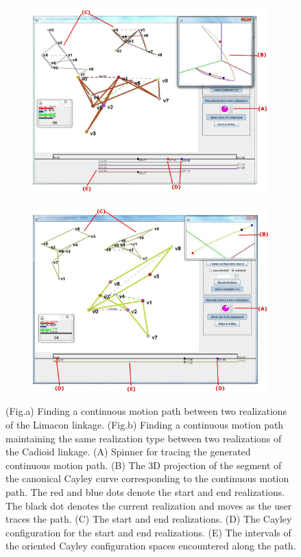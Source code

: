 \documentclass[10pt]{article}
\begin{document}
\begin{figure}[hbtp] 
\centering
\begin{subfigure}[b]{\linewidth}
\centering
\includegraphics[width=.65\textwidth]{img/path}
\caption{}
\end{subfigure}
%
\begin{subfigure}[b]{\linewidth}
\centering
\includegraphics[width=.65\textwidth]{img/opath}
\caption{}
\end{subfigure}

\caption{(Fig.a) Finding a continuous motion path between two realizations of the Limacon linkage. 
(Fig.b) Finding a continuous motion path maintaining the same realization type between two realizations of the Cadioid linkage. 
(A) Spinner for tracing the generated continuous motion path. 
(B) The 3D projection of the segment of the canonical Cayley curve corresponding to the continuous motion path. 
The red and blue dots denote the start and end realizations. 
The black dot denotes the current realization and moves as the user traces the path. 
(C) The start and end realizations.
(D) The Cayley configuration for the start and end realizations.
(E) The intervals of the oriented Cayley configuration spaces encountered along the path. }
\label{fig:paths}
\end{figure}
\end{document}
